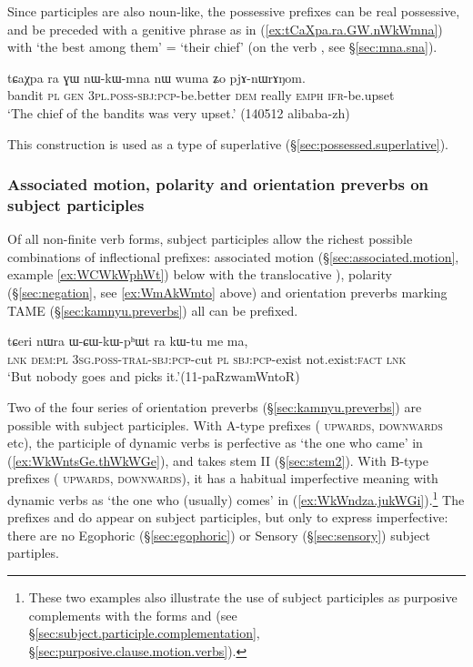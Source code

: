 Since participles are also noun-like, the possessive prefixes can be real possessive, and be preceded with a genitive phrase as in (\ref{ex:tCaXpa.ra.GW.nWkWmna}) with  `the best among them' = `their chief' (on the verb , see §\ref{sec:mna.sna}).

 \begin{exe} 
\ex \label{ex:tCaXpa.ra.GW.nWkWmna}
\gll tɕaχpa ra ɣɯ nɯ-kɯ-mna nɯ wuma ʑo pjɤ-nɯrɤŋom.\\
bandit \textsc{pl} \textsc{gen} \textsc{3pl}.\textsc{poss}-\textsc{sbj}:\textsc{pcp}-be.better \textsc{dem} really \textsc{emph} \textsc{ifr}-be.upset\\
\glt `The chief of the bandits was very upset.' (140512 alibaba-zh)
\end{exe}

This construction is used as a type of superlative (§\ref{sec:possessed.superlative}).

\subsubsection{Associated motion, polarity and orientation preverbs on subject participles}  \label{sec:subject.participle.other.prefixes}
Of all non-finite verb forms, subject participles allow the richest possible combinations of inflectional prefixes: associated motion (§\ref{sec:associated.motion}, example \ref{ex:WCWkWphWt}) below with the translocative ), polarity (§\ref{sec:negation}, see \ref{ex:WmAkWmto} above) and orientation preverbs marking TAME (§\ref{sec:kamnyu.preverbs}) all can be prefixed. 
 
\begin{exe}
\ex \label{ex:WCWkWphWt}
 \gll tɕeri nɯra ɯ-ɕɯ-kɯ-pʰɯt ra kɯ-tu me ma,   \\
 \textsc{lnk} \textsc{dem}:\textsc{pl} \textsc{3sg}.\textsc{poss}-\textsc{tral}-\textsc{sbj}:\textsc{pcp}-cut \textsc{pl} \textsc{sbj}:\textsc{pcp}-exist not.exist:\textsc{fact} \textsc{lnk} \\
 \glt `But nobody goes and picks it.'(11-paRzwamWntoR)
\end{exe}

Two of the four series of orientation preverbs (§\ref{sec:kamnyu.preverbs}) are possible with subject participles. With A-type prefixes ( \textsc{upwards},  \textsc{downwards} etc), the participle of dynamic verbs is perfective as  `the one who came' in (\ref{ex:WkWntsGe.thWkWGe}), and takes stem II (§\ref{sec:stem2}). With B-type prefixes ( \textsc{upwards},  \textsc{downwards}), it has a habitual imperfective meaning with dynamic verbs as  `the one who (usually) comes' in (\ref{ex:WkWndza.jukWGi}).\footnote{These two examples also illustrate the use of subject participles as purposive complements with the forms  and  (see §\ref{sec:subject.participle.complementation}, §\ref{sec:purposive.clause.motion.verbs}).} The prefixes  and  do appear on subject participles, but only to express imperfective: there are no Egophoric (§\ref{sec:egophoric}) or Sensory (§\ref{sec:sensory}) subject partiples.

